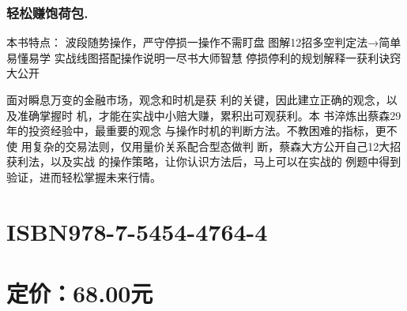 \documentclass{article}
\begin{document}
\subsubsection{轻松赚饱荷包.}

本书特点： 波段随势操作，严守停损一操作不需盯盘 图解12招多空判定法→简单易懂易学 实战线图搭配操作说明一尽书大师智慧 停损停利的规划解释一获利诀窍大公开

面对瞬息万变的金融市场，观念和时机是获 利的关键，因此建立正确的观念，以及准确掌握时 机，才能在实战中小赔大赚，累积出可观获利。本 书淬炼出蔡森29年的投资经验中，最重要的观念 与操作时机的判断方法。不教困难的指标，更不使 用复杂的交易法则，仅用量价关系配合型态做判 断，蔡森大方公开自己12大招获利法，以及实战 的操作策略，让你认识方法后，马上可以在实战的 例题中得到验证，进而轻松掌握未来行情。

\section{ISBN978-7-5454-4764-4}

\section{定价：68.00元}
\end{document}

